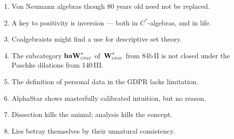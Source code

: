 \documentclass{article}
\begin{document}
\begin{enumerate}
\item
Von Neumann algebras
though 80 years old
need not be replaced.
\item
A key to positivity is inversion --- both in  $C^*$-algebras,
and in life.
\item
Coalgebraists might find a use
for  descriptive set theory.
\item
    The subcategory $\textbf{haW}^*_\text{\textsc{cpsu}}$
        of~$\textbf{W}^*_\text{\textsc{cpsu}}$ from
        \textsf{84b\,II}
        is not closed under the
         Paschke dilations from \textsf{140\,III}.

\item
The definition of personal data
in the GDPR lacks limitation.
\item
AlphaStar shows masterfully calibrated
intuition, but no reason.
\item
Dissection kills the animal;
analysis kills the concept.
\item
Lies betray themselves by their
unnatural consistency.
\end{enumerate}
\end{document}
